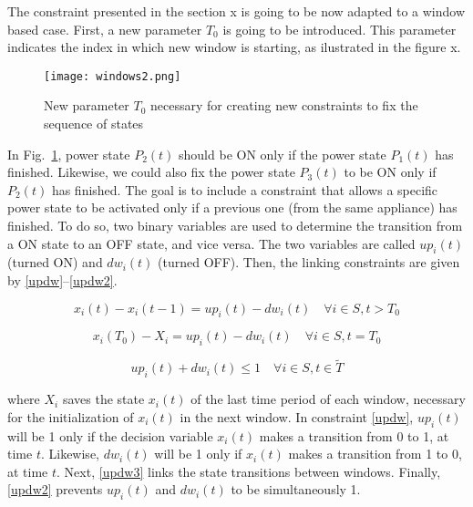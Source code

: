 The constraint presented in the section x is going to be now adapted to a window based case. First, a new parameter $T_0$ is going to be introduced. This parameter indicates the index in which new window is starting, as ilustrated in the figure x.

\begin{figure}[tb]
    \centering
    \texttt{[image: windows2.png]}
    \caption{New parameter $T_0$ necessary for creating new constraints to fix the sequence of states}
    \label{example}
\end{figure}


In Fig.~\ref{example}, power state $P_2(t)$ should be ON only if the power state $P_1(t)$ has finished. Likewise, we could also fix the power state $P_3(t)$ to be ON only if $P_2(t)$ has finished. The goal is to include a constraint that allows a specific power state to be activated only if a previous one (from the same appliance) has finished. To do so, two binary variables are used to determine the transition from a ON state to an OFF state, and vice versa. The two variables are called $up_i(t)$ (turned ON) and $dw_i(t)$ (turned OFF). Then, the linking constraints are given by \eqref{updw}--\eqref{updw2}.
%

\begin{equation} \label{updw}
    x_i(t) - x_i(t-1) = up_i(t) - dw_i(t) \quad \forall i \in S, t > T_0
\end{equation}


\begin{equation} \label{updw3}
    x_i(T_0) - X_i = up_i(t) - dw_i(t) \quad \forall i \in S, t = T_0
\end{equation}

\begin{equation} \label{updw2}
    up_i(t) + dw_i(t) \leq 1 \quad \forall i \in S, t \in \tilde{T}
\end{equation}

\noindent where $X_i$ saves the state $x_i(t)$ of the last time period of each window, necessary for the initialization of $x_i(t)$ in the next window. In constraint \eqref{updw}, $up_i(t)$ will be 1 only if the decision variable $x_i(t)$ makes a transition from 0 to 1, at time $t$. Likewise, $dw_i(t)$ will be 1 only if $x_i(t)$ makes a transition from 1 to 0, at time $t$. Next, \eqref{updw3} links the state transitions between windows. Finally, \eqref{updw2} prevents $up_i(t)$ and $dw_i(t)$ to be simultaneously 1.

